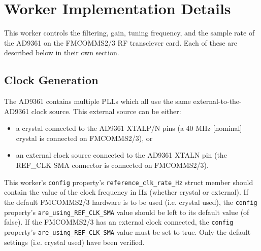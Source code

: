 \documentclass{article}
\begin{document}
\section*{Worker Implementation Details}
This worker controls the filtering, gain, tuning frequency, and the sample rate of the AD9361 on the FMCOMMS2/3 RF transciever card.  Each of these are described below in their own section.

\subsection*{Clock Generation}
The AD9361 contains multiple PLLs which all use the same external-to-the-AD9361 clock source. This external source can be either:
\begin{itemize}
\item a crystal connected to the AD9361 XTALP/N pins (a 40 MHz [nominal] crystal is connected on FMCOMMS2/3), or
\item an external clock source connected to the AD9361 XTALN pin (the REF\_CLK SMA connector is connected on FMCOMMS2/3).
\end{itemize}
This worker's \verb+config+ property's \verb+reference_clk_rate_Hz+ struct member should contain the value of the clock frequency in Hz (whether crystal or external). If the default FMCOMMS2/3 hardware is to be used (i.e. crystal used), the \verb+config+ property's \verb+are_using_REF_CLK_SMA+ value should be left to its default value (of false). If the FMCOMMS2/3 has an external clock connected, the \verb+config+ property's \verb+are_using_REF_CLK_SMA+ value must be set to true. Only the default settings (i.e. crystal used) have been verified.
\end{document}
